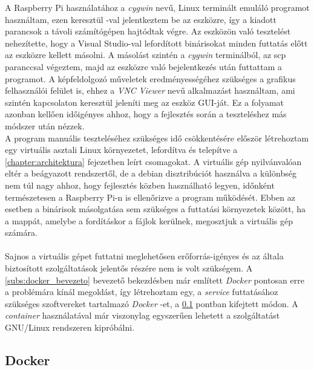 A Raspberry Pi használatához a \emph{cygwin} nevű, Linux terminált emuláló programot használtam, ezen keresztül -val jelentkeztem be az eszközre, így a kiadott parancsok a távoli számítógépen hajtódtak végre. Az eszközön való tesztelést nehezítette, hogy a Visual Studio-val lefordított binárisokat minden futtatás előtt az eszközre kellett másolni. A másolást szintén a \emph{cygwin} terminálból, az scp paranccsal végeztem, majd az eszközre való bejelentkezés után futtattam a programot. A képfeldolgozó műveletek eredményességéhez szükséges a grafikus felhasználói felület is, ehhez a \emph{VNC Viewer} nevű alkalmazást használtam, ami szintén  kapcsolaton keresztül jeleníti meg az eszköz GUI-ját. Ez a folyamat azonban  kellően időigényes ahhoz, hogy a fejlesztés során a teszteléshez más módszer után nézzek. \\
A program manuális teszteléséhez szükséges idő csökkentésére először létrehoztam egy virtuális asztali Linux környezetet, lefordítva és telepítve a \ref{chapter:architektura} fejezetben leírt csomagokat. A virtuális gép nyilvánvalóan eltér a beágyazott rendszertől, de a debian disztribúciót használva a különbség nem túl nagy ahhoz, hogy fejlesztés közben használható legyen, időnként természetesen a Raspberry Pi-n is ellenőrizve a program működését. Ebben az esetben a binárisok másolgatása sem szükséges a futtatási környezetek között, ha a mappát, amelybe a fordításkor a fájlok kerülnek, megosztjuk a virtuális gép számára.\\
\\
Sajnos a virtuális gépet futtatni meglehetősen erőforrás-igényes és az általa biztosított szolgáltatások jelentős részére nem is volt szükségem. A \ref{subs:docker_bevezeto} bevezető bekezdésben már említett \emph{Docker} pontosan erre a problémára kínál megoldást, így létrehoztam egy, a \emph{service} futtatásához szükséges szoftvereket tartalmazó \emph{Docker} -et, a \ref{subs:docker} pontban kifejtett módon. A \emph{container} használatával már viszonylag egyszerűen lehetett a szolgáltatást GNU/Linux rendszeren kipróbálni.

\subsection{Docker} \label{subs:docker}

